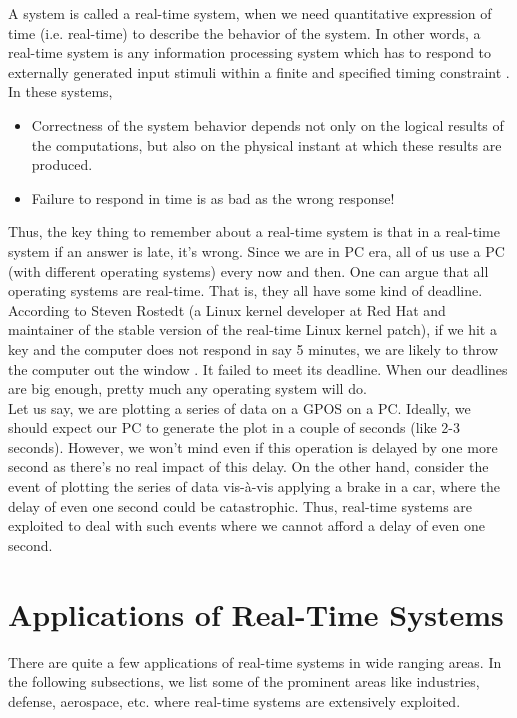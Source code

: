 \documentclass[12pt]{report}
\begin{document}
A system is called a real-time system, when we need quantitative expression of time (i.e. real-time) to describe the behavior of the system. In other words, a real-time system is any information processing system which has to respond to externally generated input stimuli within a finite and specified timing constraint \cite{unsw}. In  these systems, 
\begin{itemize}
  \setlength\itemsep{-0.2em}
    \item Correctness of the system behavior depends not only on the logical results of the computations, but also on the physical instant at which these results are produced. 
    \item Failure to respond in time is as bad as the wrong response! 
\end{itemize}
Thus, the key thing to remember about a real-time system is that in a real-time system if an answer is late, it's wrong. Since we are in PC era, all of us use a PC (with different operating systems) every now and then. One can argue that all operating systems are real-time. That is, they all have some kind of deadline. According to  Steven Rostedt (a Linux kernel developer at Red Hat and maintainer of the stable version of the real-time Linux kernel patch), if we hit a key and the computer does not respond in say 5 minutes, we are likely to throw the computer out the window \cite{rtlinux}. It failed to meet its deadline. When our deadlines are big enough, pretty much any operating system will do. \\

Let us say, we are plotting a series of data on a GPOS on a PC. Ideally, we should expect our PC to generate the plot in a couple of seconds (like 2-3 seconds). However, we won't mind even if this operation is delayed by one more second as there's no real impact of this delay. On the other hand, consider the event of plotting the series of data vis-\`a-vis applying a brake in a car, where the delay of even one second could be catastrophic. Thus, real-time systems are exploited to deal with such events where we cannot afford a delay of even one second. 

\section{Applications of Real-Time Systems}
There are quite a few applications of real-time systems in wide ranging areas. In the following subsections, we list some of the prominent areas like industries, defense, aerospace, etc. where real-time systems are extensively exploited. 
\end{document}
